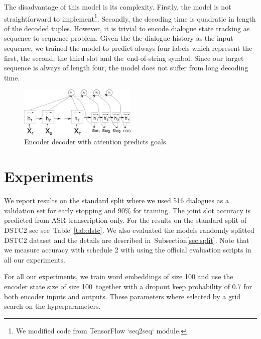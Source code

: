\documentclass{itatnew}
\def\PB#1{\textcolor{red}{PB: \textit{#1}}}
\def\todo#1{\textcolor{purple}{todo: \textit{#1}}}
\begin{document}
The disadvantage of this model is its complexity.
Firstly, the model is not straightforward to implement\footnote{We modified code from TensorFlow `seq2seq` module.}. Secondly, the decoding time is quadratic in length of the decoded tuples.
However, it is trivial to encode dialogue state tracking as sequence-to-sequence problem. Given the the dialogue history as the input sequence, we trained the model to predict always four labels which represent the first, the second, the third slot and the~end-of-string symbol.
Since our target sequence is always of length four, the model does not suffer from long decoding time. 
\begin{figure}
\includegraphics[width=0.5\textwidth]{encdec}
\caption{Encoder decoder with attention predicts goals.}
\label{fig:encdec}
\end{figure}

\section{Experiments}
\label{sec:exp}

We report results on the standard split where we used 516 dialogues as a validation set for early stopping\cite{prechelt1998early} and 90\% for training. The joint slot accuracy is predicted from ASR transcription only.
For the results on the standard split of DSTC2 see see~Table~\ref{tab:dstc}.
We also evaluated the models randomly splitted DSTC2 dataset and the details are described in~Subsection\ref{sec:split}.
Note that we measure accuracy with schedule 2 with using the official evaluation scripts in all our experiments.


For all our experiments, we train word embeddings of size 100 and use the encoder state size of size 100\, together with a dropout keep probability of $0.7$ for both encoder inputs and outputs.
These parameters where selected by a grid search on the hyperparameters.
\end{document}

